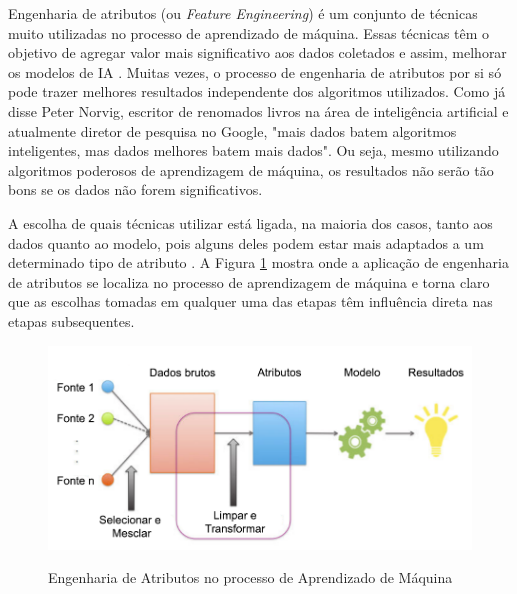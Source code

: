 \documentclass[oneside,openright,12pt]{ufsm_2015} %
\begin{document}
    \par Engenharia de atributos (ou \textit{Feature Engineering}) é um conjunto de técnicas muito utilizadas no processo de aprendizado de máquina. Essas técnicas têm o objetivo de agregar valor mais significativo aos dados coletados e assim, melhorar os modelos de IA \cite{book:zheng:2018}. Muitas vezes, o processo de engenharia de atributos por si só pode trazer melhores resultados independente dos algoritmos utilizados. Como já disse Peter Norvig, escritor de renomados livros na área de inteligência artificial e atualmente diretor de pesquisa no Google, "mais dados batem algoritmos inteligentes, mas dados melhores batem mais dados". Ou seja, mesmo utilizando algoritmos poderosos de aprendizagem de máquina, os resultados não serão tão bons se os dados não forem significativos.
    
    \par A escolha de quais técnicas utilizar está ligada, na maioria dos casos, tanto aos dados quanto ao modelo, pois alguns deles podem estar mais adaptados a um determinado tipo de atributo \cite{book:zheng:2018}. A Figura \ref{fig:feature-engineering} mostra onde a aplicação de engenharia de atributos se localiza no processo de aprendizagem de máquina e torna claro que as escolhas tomadas em qualquer uma das etapas têm influência direta nas etapas subsequentes.
    
    \begin{figure}[ht]
        \caption{Engenharia de Atributos no processo de Aprendizado de Máquina}
        \centering
        \includegraphics[width=1\textwidth]{figuras/feature-engineering.png}
        \vspace{\baselineskip} %
        \label{fig:feature-engineering}
    \end{figure}
    
\end{document}
